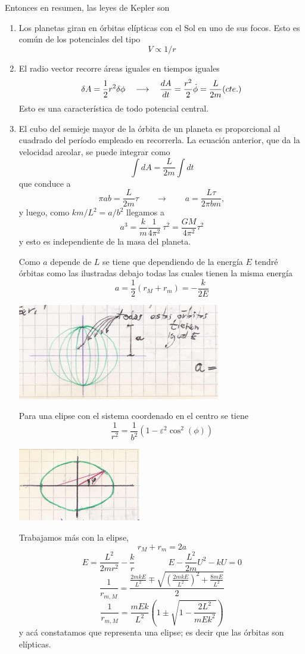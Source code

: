 \documentclass[10pt,oneside]{CBFT_book}
\begin{document}
Entonces en resumen, las leyes de Kepler son
\begin{enumerate}
 \item Los planetas giran en órbitas elípticas con el Sol en uno de sus focos. Esto es común de los potenciales del 
tipo 
	\[
		V \propto 1/r
	\]
 \item El radio vector recorre áreas iguales en tiempos iguales
	\[
		\delta A = \frac{1}{2} r^2 \delta \phi \quad \longrightarrow \quad \frac{d^{\hspace{-0.05em}} {A}}{d {t}^{\hspace{-0.05em}}} = \frac{r^2}{2} 
\dot{\phi} = \frac{L}{2m} (cte.)
	\]
	Esto es una característica de todo potencial central.
 \item El cubo del semieje mayor de la órbita de un planeta es proporcional al cuadrado del período empleado en 
recorrerla.
	La ecuación anterior, que da la velocidad areolar, se puede integrar como 
	\[
		\int dA  = \frac{L}{2m} \int dt
	\]
	que conduce a 
	\[
		\pi a b = \frac{L}{2m} \tau \qquad \longrightarrow \qquad a = \frac{L\tau}{2\pi b m}, 
	\]
	y luego, como $k m /L ^2 = a/b^2$ llegamos a 
	\[
		a^3 = \frac{k}{m} \frac{1}{4\pi^2} \: \tau^2 = \frac{GM}{4\pi^2} \tau^2
	\]
 y esto es independiente de la masa del planeta.
 
Como $a$ depende de $L$ se tiene que dependiendo de la energía $E$ tendré órbitas como las ilustradas debajo
todas las cuales tienen la misma energía 
\[
	a = \frac{1}{2}(r_M + r_m) = -\frac{k}{2E}
\] 

\includegraphics[scale=0.3]{images/fig_mc_orbitas_elipticas.jpg}

 Para una elipse con el sistema coordenado en el centro se tiene 
 \[
	\frac{1}{r^2} = \frac{1}{b^2}( 1-\varepsilon^2 \cos^2 (\phi) )
 \]
 
\includegraphics[scale=0.3]{images/fig_mc_orbitas_elipticas_2.jpg} 
 
 Trabajamos más con la elipse,
 \[
	r_M + r_m = 2a
 \]
 \[
	E = \frac{L^2}{2mr^2} - \frac{k}{r}	\qquad\qquad E - \frac{L^2}{2m} U^2 - kU = 0
 \]
 \[
	\frac{1}{r_{m,M}} = \frac{ \frac{2mkE}{L^2} \mp \sqrt{ \left(\frac{2mkE}{L^2}\right)^2 + \frac{8mE}{L^2} } }{2}
 \]
 \[
	\frac{1}{r_{m,M}} = \frac{mEk}{L^2} \left( 1 \pm \sqrt{1 - \frac{2L^2}{mEk^2}}\right) 
 \]
 y acá constatamos que representa una elipse; es decir que las órbitas son elípticas.
\end{enumerate}
\end{document}

